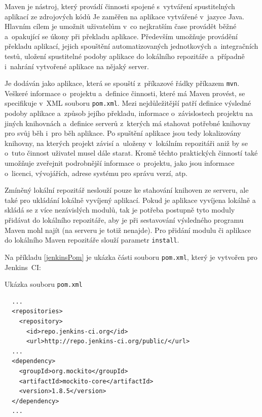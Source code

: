         Maven je nástroj, který provádí činnosti spojené s~vytváření spustitelných aplikací ze zdrojových kódů 
        Je zaměřen na aplikace vytvářené v~jazyce Java. Hlavním cílem je umožnit uživatelům v~co nejkratším
        čase provádět běžné a~opakující se úkony při překladu aplikace. Především umožňuje
        provádění překladu aplikací, jejich spouštění automatizovaných jednotkových
a~integračních testů, uložení spustitelné podoby aplikace do lokálního repozitáře 
        a~případně i~nahrání vytvořené aplikace na nějaký server. 

        Je dodáván jako aplikace, která se spouští z~příkazové řádky příkazem \texttt{mvn}. Veškeré
        informace o~projektu a~definice činnosti, které má Maven provést, se specifikuje 
        v~XML souboru \texttt{pom.xml}. Mezi nejdůležitější patří definice výsledné podoby aplikace
        a~způsob jejího překladu, informace o~závislostech
        projektu na jiných knihovnách a~definice serverů z~kterých má stahovat potřebné knihovny pro svůj 
        běh i~pro běh aplikace. Po spuštění aplikace jsou tedy lokalizovány knihovny, na kterých projekt
        závisí a~uloženy v~lokálním repozitáři aniž by se o~tuto činnost uživatel musel dále starat.
        Kromě těchto praktických činností také umožňuje zveřejnit podrobnější informace o~projektu,         
        jako jsou informace o~licenci, vývojářích, adrese systému pro správu verzí, atp.

        Zmíněný lokální repozitář neslouží pouze ke stahování knihoven ze serveru, ale
        také pro ukládání lokálně vyvíjený aplikací.
        Pokud je aplikace vyvíjena lokálně a skládá se z více nezávislých modulů, tak je potřeba
        postupně tyto moduly přidávat do lokálního repozitáře, aby je při sestavování
        výsledného programu Maven mohl najít (na serveru je totiž nenajde). Pro přidání modulu či aplikace do 
        lokálního Maven repozitáře slouží parametr \texttt{install}.


        Na příkladu \ref{jenkinsPom} je ukázka části souboru \texttt{pom.xml}, který je vytvořen pro Jenkins~CI:
        \begin{priklad} \label{jenkinsPom} 
            Ukázka souboru \texttt{pom.xml}
\begin{verbatim}
  ...
  <repositories>
    <repository>
      <id>repo.jenkins-ci.org</id>
      <url>http://repo.jenkins-ci.org/public/</url>
  ...
  <dependency>
    <groupId>org.mockito</groupId>
    <artifactId>mockito-core</artifactId>
    <version>1.8.5</version>
  </dependency>
  ...
\end{verbatim}
        \end{priklad}

